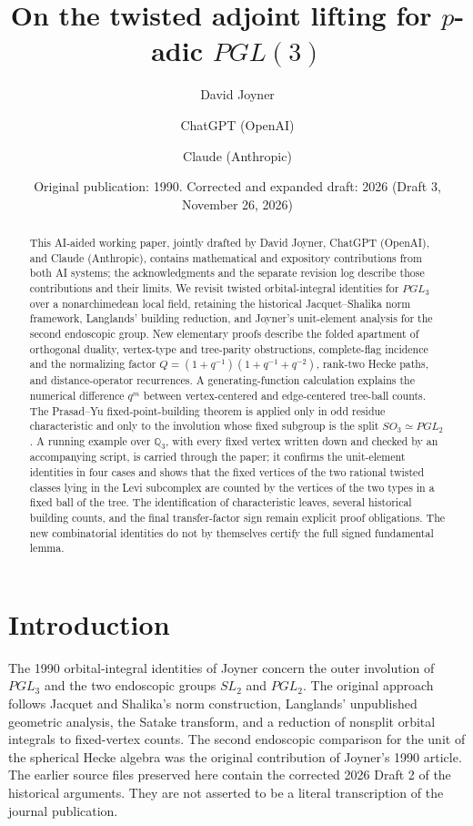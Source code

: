 \documentclass[12pt,letterpaper]{amsart}
\title[The twisted adjoint lifting for $p$-adic $PGL(3)$]{On the twisted adjoint lifting for $p$-adic $PGL(3)$}
\author{David Joyner}
\author{ChatGPT (OpenAI)}
\author{Claude (Anthropic)}
\date{Original publication: 1990. Corrected and expanded draft: 2026 (Draft 3, November 26, 2026)}
\numberwithin{equation}{section}
\theoremstyle{definition}
\theoremstyle{plain}
\begin{document}
\begin{abstract}
This AI-aided working paper, jointly drafted by David Joyner, ChatGPT
(OpenAI), and Claude (Anthropic), contains mathematical and expository
contributions from both AI systems;
the acknowledgments and the separate revision log describe those
contributions and their limits. We revisit twisted orbital-integral
identities for $PGL_3$ over a nonarchimedean local field, retaining the
historical Jacquet--Shalika norm framework, Langlands' building reduction,
and Joyner's unit-element analysis for the second endoscopic group.
New elementary proofs describe the folded apartment of orthogonal duality,
vertex-type and tree-parity obstructions, complete-flag incidence and the
normalizing factor $Q=(1+q^{-1})(1+q^{-1}+q^{-2})$, rank-two Hecke paths,
and distance-operator recurrences. A generating-function calculation
explains the numerical difference $q^m$ between vertex-centered and
edge-centered tree-ball counts. The Prasad--Yu fixed-point-building
theorem is applied only in odd residue characteristic and only to the
involution whose fixed subgroup is the split $SO_3\simeq PGL_2$.
A running example over $\mathbb Q_3$, with every fixed vertex written
down and checked by an accompanying script, is carried through the
paper; it confirms the unit-element identities in four cases and shows
that the fixed vertices of the two rational twisted classes lying in
the Levi subcomplex are counted by the vertices of the two types in a
fixed ball of the tree.
The identification of characteristic leaves, several historical
building counts, and the final transfer-factor sign remain explicit
proof obligations. The new combinatorial identities do not by themselves
certify the full signed fundamental lemma.
\end{abstract}
\maketitle

\tableofcontents

\section{Introduction}
\label{sec:revisit-motivation}

The 1990 orbital-integral identities of Joyner \cite{Jo90} concern the
outer involution of $PGL_3$ and the two endoscopic groups $SL_2$ and
$PGL_2$. The original approach follows Jacquet and Shalika's norm
construction, Langlands' unpublished geometric analysis, the Satake
transform, and a reduction of nonsplit orbital integrals to fixed-vertex
counts. The second endoscopic comparison for the unit of the spherical
Hecke algebra was the original contribution of Joyner's 1990 article.
The earlier source files preserved here contain the corrected 2026 Draft 2
of the historical arguments. They are not asserted to be a literal
transcription of the journal publication.
\end{document}
